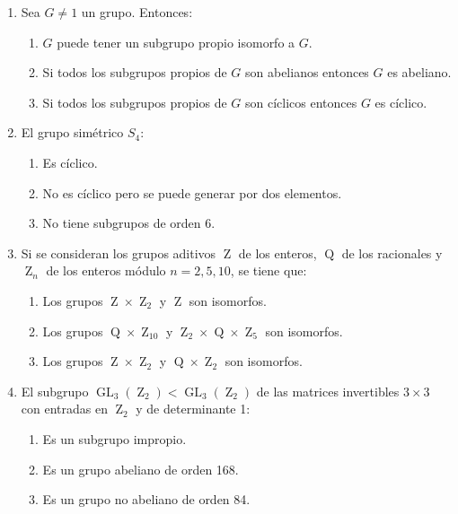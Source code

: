 \documentclass[12pt]{article}
\DeclareMathOperator{\GL}{GL}
\DeclareMathOperator{\SL}{GL}
\DeclareMathOperator{\Z}{Z}
\DeclareMathOperator{\Q}{Q}
\begin{document}
\begin{ejercicio}
\begin{enumerate}
            \item Sea $G \neq 1$ un grupo. Entonces:
            \begin{enumerate}
                \item $G$ puede tener un subgrupo propio isomorfo a $G$.
                \item Si todos los subgrupos propios de $G$ son abelianos entonces $G$ es abeliano.
                \item Si todos los subgrupos propios de $G$ son cíclicos entonces $G$ es cíclico.
            \end{enumerate}

            \item El grupo simétrico $S_4$:
            \begin{enumerate}
                \item Es cíclico.
                \item No es cíclico pero se puede generar por dos elementos.
                \item No tiene subgrupos de orden 6.
            \end{enumerate}

            \item Si se consideran los grupos aditivos $\Z$ de los enteros, $\Q$ de los racionales y $\Z_n$ de los enteros módulo $n=2,5,10$, se tiene que:
            \begin{enumerate}
                \item Los grupos $\Z \times \Z_2$ y $\Z$ son isomorfos.
                \item Los grupos $\Q \times \Z_{10}$ y $\Z_2 \times \Q \times \Z_5$ son isomorfos.
                \item Los grupos $\Z \times \Z_2$ y $\Q \times \Z_2$ son isomorfos.
            \end{enumerate}

            \item El subgrupo $\SL_3(\Z_2) < \GL_3(\Z_2)$ de las matrices invertibles $3\times 3$ con entradas en $\Z_2$ y de determinante 1:
            \begin{enumerate}
                \item Es un subgrupo impropio.
                \item Es un grupo abeliano de orden 168.
                \item Es un grupo no abeliano de orden 84.
            \end{enumerate}

        \end{enumerate}
    \end{ejercicio}
\end{document}

